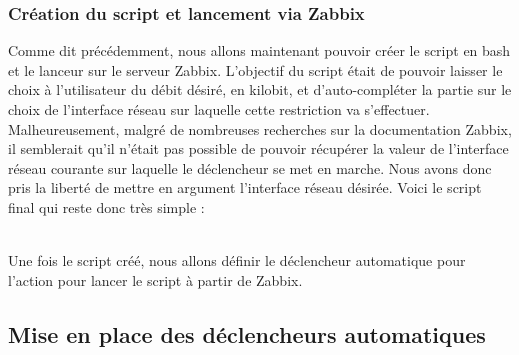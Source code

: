 		\subsubsection{Création du script et lancement via Zabbix}
			\vspace{0.3cm}

			Comme dit précédemment, nous allons maintenant pouvoir créer le script en bash et le lanceur sur le serveur Zabbix. L'objectif du script était de pouvoir laisser le choix à l'utilisateur du débit désiré, en kilobit, et d'auto-compléter la partie sur le choix de l'interface réseau sur laquelle cette restriction va s'effectuer. Malheureusement, malgré de nombreuses recherches sur la documentation Zabbix, il semblerait qu'il n'était pas possible de pouvoir récupérer la valeur de l'interface réseau courante sur laquelle le déclencheur se met en marche. Nous avons donc pris la liberté de mettre en argument l'interface réseau désirée. Voici le script final qui reste donc très simple :

			\\
			
			Une fois le script créé, nous allons définir le déclencheur automatique pour l'action pour lancer le script à partir de Zabbix.

	\subsection{Mise en place des déclencheurs automatiques}
		\vspace{0.3cm}		

